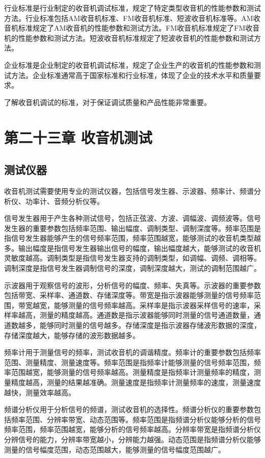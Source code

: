 \documentclass[12pt,UTF8]{ctexbook}
\begin{document}
行业标准是行业制定的收音机调试标准，规定了特定类型收音机的性能参数和测试方法。行业标准包括AM收音机标准、FM收音机标准、短波收音机标准等。AM收音机标准规定了AM收音机的性能参数和测试方法。FM收音机标准规定了FM收音机的性能参数和测试方法。短波收音机标准规定了短波收音机的性能参数和测试方法。

企业标准是企业制定的收音机调试标准，规定了企业生产的收音机的性能参数和测试方法。企业标准通常高于国家标准和行业标准，体现了企业的技术水平和质量要求。

了解收音机调试的标准，对于保证调试质量和产品性能非常重要。

\chapter{第二十三章 收音机测试}

\section{测试仪器}

收音机测试需要使用专业的测试仪器，包括信号发生器、示波器、频率计、频谱分析仪、功率计、音频分析仪等。

信号发生器用于产生各种测试信号，包括正弦波、方波、调幅波、调频波等。信号发生器的重要参数包括频率范围、输出幅度、调制类型、调制深度等。频率范围是指信号发生器能够产生的信号频率范围，频率范围越宽，能够测试的收音机类型越多。输出幅度是指信号发生器输出信号的幅度，输出幅度越大，能够测试的收音机灵敏度越高。调制类型是指信号发生器支持的调制类型，如调幅、调频、调相等。调制深度是指信号发生器调制信号的深度，调制深度越大，测试的调制范围越广。

示波器用于观察信号的波形，分析信号的幅度、频率、失真等。示波器的重要参数包括带宽、采样率、通道数、存储深度等。带宽是指示波器能够测量的信号频率范围，带宽越宽，能够测量的信号频率越高。采样率是指示波器采样信号的速率，采样率越高，测量的精度越高。通道数是指示波器能够同时测量的信号通道数量，通道数越多，能够同时测量的信号越多。存储深度是指示波器存储波形数据的深度，存储深度越大，能够存储的波形数据越多。

频率计用于测量信号的频率，测试收音机的调谐精度。频率计的重要参数包括频率范围、测量精度、测量速度等。频率范围是指频率计能够测量的信号频率范围，频率范围越宽，能够测量的信号频率越高。测量精度是指频率计测量频率的精度，测量精度越高，测量的结果越准确。测量速度是指频率计测量频率的速度，测量速度越快，测量效率越高。

频谱分析仪用于分析信号的频谱，测试收音机的选择性。频谱分析仪的重要参数包括频率范围、分辨率带宽、动态范围等。频率范围是指频谱分析仪能够分析的信号频率范围，频率范围越宽，能够分析的信号频率越高。分辨率带宽是指频谱分析仪分辨信号的能力，分辨率带宽越小，分辨能力越强。动态范围是指频谱分析仪能够测量的信号幅度范围，动态范围越大，能够测量的信号幅度范围越广。
\end{document}
